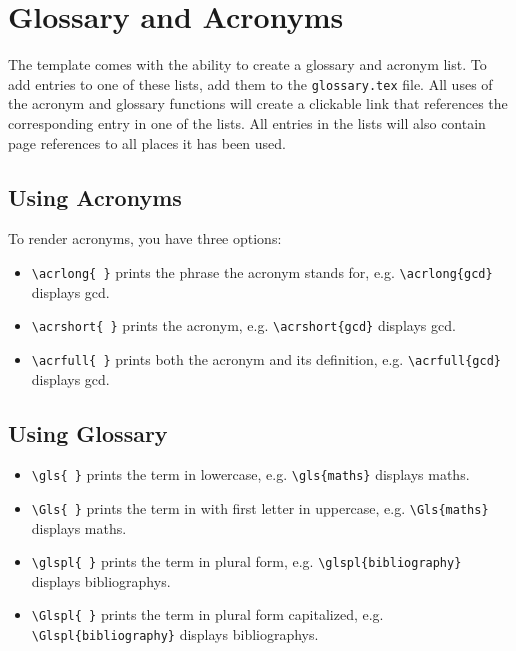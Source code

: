 \section{Glossary and Acronyms}
The template comes with the ability to create a glossary and acronym list. To add entries to one of these lists, add them to the \texttt{glossary.tex} file.
All uses of the acronym and glossary functions will create a clickable link that references the corresponding entry in one of the lists. All entries in the lists will also contain page references to all places it has been used.
\subsection{Using Acronyms}
To render acronyms, you have three options:
\begin{itemize}
  \item \texttt{\textbackslash acrlong\{ \}} prints the phrase the acronym stands for, e.g. \texttt{\textbackslash acrlong\{gcd\}} displays \acrlong{gcd}.
  \item \texttt{\textbackslash acrshort\{ \}} prints the acronym, e.g. \texttt{\textbackslash acrshort\{gcd\}} displays \acrshort{gcd}.
  \item \texttt{\textbackslash acrfull\{ \}} prints both the acronym and its definition, e.g. \texttt{\textbackslash acrfull\{gcd\}} displays \acrfull{gcd}.
\end{itemize}

\subsection{Using Glossary}
\begin{itemize}
  \item \texttt{\textbackslash gls\{ \}} prints the term in lowercase, e.g. \texttt{\textbackslash gls\{maths\}} displays \gls{maths}.
  \item \texttt{\textbackslash Gls\{ \}} prints the term in with first letter in uppercase, e.g. \texttt{\textbackslash Gls\{maths\}} displays \Gls{maths}.
  \item \texttt{\textbackslash glspl\{ \}} prints the term in plural form, e.g. \texttt{\textbackslash glspl\{bibliography\}} displays \glspl{bibliography}.
  \item \texttt{\textbackslash Glspl\{ \}} prints the term in plural form capitalized, e.g. \texttt{\textbackslash Glspl\{bibliography\}} displays \Glspl{bibliography}.
\end{itemize}


